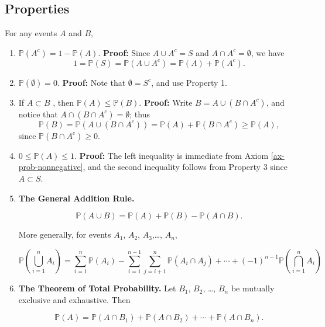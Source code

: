 \documentclass[]{book}
\providecommand{\tightlist}{%
  \setlength{\itemsep}{0pt}\setlength{\parskip}{0pt}}
\numberwithin{equation}{chapter}
\numberwithin{figure}{chapter}
\theoremstyle{plain}
\theoremstyle{definition}
\theoremstyle{remark}
\theoremstyle{definition}
\theoremstyle{definition}
\theoremstyle{remark}
\begin{document}
\subsection{Properties}\label{properties}

For any events \(A\) and \(B\),

\begin{enumerate}
\def\labelenumi{\arabic{enumi}.}
\tightlist
\item
  \label{enu-prop-prob-complement}
  \(\mathbb{P}(A^{c})=1-\mathbb{P}(A)\). \textbf{Proof:} Since
  \(A\cup A^{c}=S\) and \(A\cap A^{c}=\emptyset\), we have \[
     1=\mathbb{P}(S)=\mathbb{P}(A\cup A^{c})=\mathbb{P}(A)+\mathbb{P}(A^{c}).
     \]
\item
  \(\mathbb{P}(\emptyset)=0\). \textbf{Proof:} Note that
  \(\emptyset=S^{c}\), and use Property 1.
\item
  If \(A\subset B\) , then \(\mathbb{P}(A)\leq\mathbb{P}(B)\).
  \textbf{Proof:} Write \(B=A\cup\left(B\cap A^{c}\right)\), and notice
  that \(A\cap\left(B\cap A^{c}\right)=\emptyset\); thus \[
     \mathbb{P}(B)=\mathbb{P}(A\cup\left(B\cap A^{c}\right))=\mathbb{P}(A)+\mathbb{P}\left(B\cap A^{c}\right)\geq\mathbb{P}(A),
     \] since \(\mathbb{P}\left(B\cap A^{c}\right)\ge0\).
\item
  \(0\leq\mathbb{P}(A)\leq1\). \textbf{Proof:} The left inequality is
  immediate from Axiom \ref{ax-prob-nonnegative}, and the second
  inequality follows from Property 3 since \(A\subset S\).
\item
  \textbf{The General Addition Rule.}

  \begin{equation}
     \label{eq-general-addition-rule-1}
     \mathbb{P}(A\cup B)=\mathbb{P}(A)+\mathbb{P}(B)-\mathbb{P}(A\cap B).
     \end{equation}

  More generally, for events \(A_{1}\), \(A_{2}\), \(A_{3}\),\ldots{},
  \(A_{n}\),

  \begin{equation}
     \mathbb{P}\left(\bigcup_{i=1}^{n}A_{i}\right)=\sum_{i=1}^{n}\mathbb{P}(A_{i})-\sum_{i=1}^{n-1}\sum_{j=i+1}^{n}\mathbb{P}(A_{i}\cap A_{j})+\cdots+(-1)^{n-1}\mathbb{P}\left(\bigcap_{i=1}^{n}A_{i}\right)
     \end{equation}
\item
  \textbf{The Theorem of Total Probability.} Let \(B_{1}\), \(B_{2}\),
  \ldots{}, \(B_{n}\) be mutually exclusive and exhaustive. Then

  \begin{equation}
     \label{eq-theorem-total-probability}
     \mathbb{P}(A)=\mathbb{P}(A\cap B_{1})+\mathbb{P}(A\cap B_{2})+\cdots+\mathbb{P}(A\cap B_{n}).
     \end{equation}
\end{enumerate}
\end{document}
